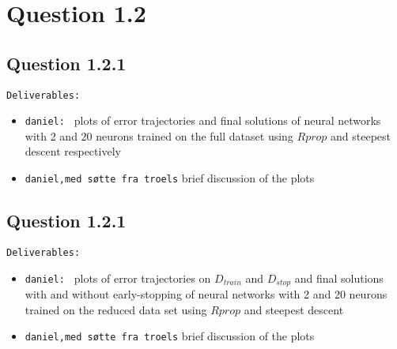 \section*{Question 1.2}

\subsection*{Question 1.2.1}

\texttt{Deliverables:} 
\begin{itemize}
	\item \texttt{daniel: } plots of error trajectories and final solutions of neural networks with 2 and 20 neurons trained on the full dataset using $Rprop$ and steepest descent respectively
	
	\item \texttt{daniel,med søtte fra troels} brief discussion of the plots 
\end{itemize}

\subsection*{Question 1.2.1} \texttt{Deliverables:} 
\begin{itemize}
	
	\item \texttt{daniel: } plots of error trajectories on $D_{train}$ and $D_{stop}$ and final solutions with and without early-stopping of neural networks with 2 and 20 neurons trained on the reduced data set using $Rprop$ and steepest descent
	
	\item \texttt{daniel,med søtte fra troels} brief discussion of the plots 
\end{itemize}
